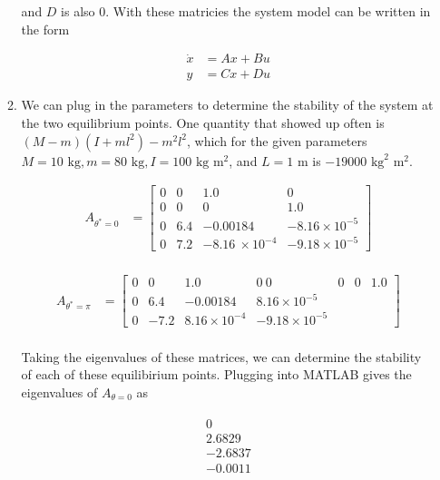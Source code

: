 \documentclass[11pt]{article}
\theoremstyle{definition}
\begin{document}
\begin{enumerate}
\begin{enumerate}
        and $D$ is also 0.  With these matricies the system model can be written in the form

        \begin{align}
            \dot{x} &= Ax + Bu\\
            y &= Cx + Du
        \end{align}


        \item %
        We can plug in the parameters to determine the stability of the system at the two equilibrium points.  One quantity that showed up often is $(M - m)(I + ml^2) - m^2 l^2$, which for the given parameters $M = 10 \text{ kg}, m = 80 \text{ kg}, I = 100 \text{ kg}\text{ m}^2$, and $L = 1 \text{ m}$ is $-19000 \text{ kg}^2 \text{ m}^2$.

        \begin{align}
             A_{\theta^* = 0} &= \begin{bmatrix}
             0 & 0 & 1.0 & 0\\
             0 & 0 & 0 & 1.0\\
             0 & 6.4 & -0.00184 & -8.16 \times {10}^{-5}\\
             0 & 7.2 & -8.16\ \times {10}^{-4} & -9.18 \times {10}^{-5} 
             \end{bmatrix} \\
        \end{align}

        \begin{align}
             A_{\theta^* = \pi} &= \begin{bmatrix}
             0 & 0 & 1.0 & 0\
             0 & 0 & 0 & 1.0\\
             0 & 6.4 & -0.00184 & 8.16 \times {10}^{-5}\\
             0 & -7.2 & 8.16 \times {10}^{-4} & -9.18 \times {10}^{-5} 
             \end{bmatrix} \\
        \end{align}

        Taking the eigenvalues of these matrices, we can determine the stability of each of these equilibirium points.  Plugging into MATLAB gives the eigenvalues of $A_{\theta = 0}$ as    

        \begin{align*}
            \begin{matrix}
                 0 \\
            2.6829 \\
           -2.6837 \\
           -0.0011
            \end{matrix}
        \end{align*}


\end{enumerate}
\end{enumerate}
\end{document}
